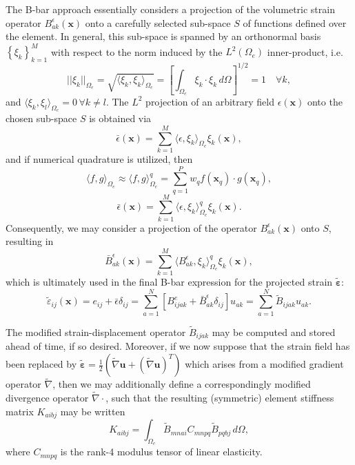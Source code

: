 \documentclass[12pt]{book}
\begin{document}
The B-bar approach essentially considers a projection of the volumetric strain operator $B^\epsilon_{ak} (\mathbf{x})$ onto a carefully selected sub-space $S$ of functions defined over the element. In general, this sub-space is spanned by an orthonormal basis $\left\{ \xi_k \right\}_{k = 1}^{M}$ with respect to the norm induced by the $L^2 (\Omega_e)$ inner-product, i.e.
\begin{equation}
  || \xi_k ||_{\Omega_e} = \sqrt{\langle \xi_k, \xi_k \rangle_{\Omega_e}} = \left[ \int_{\Omega_e} \xi_k \cdot \xi_k \, d \Omega \right]^{1/2} = 1 \quad \forall k,
\end{equation}
and $\langle \xi_k, \xi_l \rangle_{\Omega_e} = 0 \, \forall k \neq l$. The $L^2$ projection of an arbitrary field $\epsilon (\mathbf{x})$ onto the chosen sub-space $S$ is obtained via
\begin{equation}
  \bar{\epsilon} (\mathbf{x}) = \sum_{k=1}^{M} \langle \epsilon, \xi_k \rangle_{\Omega_e} \xi_k (\mathbf{x}),
\end{equation}
and if numerical quadrature is utilized, then
\begin{equation}
  \langle f, g \rangle_{\Omega_e} \approx \langle f, g \rangle^q_{\Omega_e} = \sum_{q=1}^{P} w_q f (\mathbf{x}_q) \cdot g (\mathbf{x}_q),
\end{equation}
\begin{equation}
  \bar{\epsilon} (\mathbf{x}) = \sum_{k=1}^{M} \langle \epsilon, \xi_k \rangle^q_{\Omega_e} \xi_k (\mathbf{x}).
\end{equation}
Consequently, we may consider a projection of the operator $B^\epsilon_{ak} (\mathbf{x})$ onto $S$, resulting in
\begin{equation}
  \bar{B}^\epsilon_{ak} (\mathbf{x}) = \sum_{k=1}^{M} \langle B^\epsilon_{ak}, \xi_k \rangle^q_{\Omega_e} \xi_k (\mathbf{x}),
\end{equation}
which is ultimately used in the final B-bar expression for the projected strain $\tilde{\boldsymbol{\varepsilon}}$:
\begin{equation}
  \tilde{\varepsilon}_{ij} (\mathbf{x}) = e_{ij} + \bar{\epsilon} \delta_{ij} = \sum_{a = 1}^N \left[ B^e_{ijak} + \bar{B}^\epsilon_{ak} \delta_{ij} \right] u_{ak} = \sum_{a = 1}^N \tilde{B}_{ijak} u_{ak}.
\end{equation}

The modified strain-displacement operator $\tilde{B}_{ijak}$ may be computed and stored ahead of time, if so desired. Moreover, if we now suppose that the strain field has been replaced by $\tilde{\boldsymbol{\varepsilon}} = \frac{1}{2} (\tilde{\nabla} \mathbf{u} + (\tilde{\nabla} \mathbf{u})^T)$ which arises from a modified gradient operator $\tilde{\nabla}$, then we may additionally define a correspondingly modified divergence operator $\tilde{\nabla} \cdot$, such that the resulting (symmetric) element stiffness matrix $K_{aibj}$ may be written
\begin{equation}
  K_{aibj} = \int_{\Omega_e} \tilde{B}_{mnai} C_{mnpq} \tilde{B}_{pqbj} \, d \Omega,
\end{equation}
where $C_{mnpq}$ is the rank-4 modulus tensor of linear elasticity.
\end{document}
